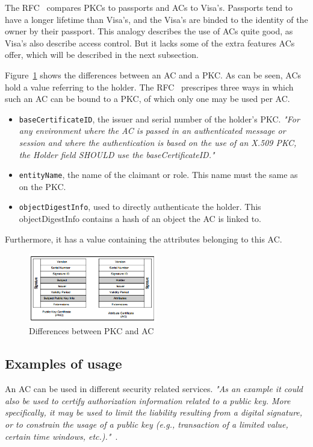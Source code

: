 \documentclass[10pt,conference,a4paper]{IEEEtran}
\begin{document}
The RFC~\cite{rfc_ac} compares PKCs to passports and ACs to Visa's. Passports tend to have a longer lifetime than Visa's, and the Visa's are binded to the identity of the owner by their passport. This analogy describes the use of ACs quite good, as Visa's also describe access control. But it lacks some of the extra features ACs offer, which will be described in the next subsection.

 Figure~\ref{fig:diff} shows the differences between an AC and a PKC. As can be seen, ACs hold a value referring to the holder. The RFC~\cite{rfc_ac} prescripes three ways in which such an AC can be bound to a PKC, of which only one may be used per AC.
\begin{itemize}
	\item \texttt{baseCertificateID}, the issuer and serial number of the holder's PKC. \textit{"For any environment where the AC is passed in an authenticated message or session and where the authentication is based on the use of an X.509 PKC, the Holder field SHOULD use the baseCertificateID."}~\cite{rfc_ac}
	\item \texttt{entityName}, the name of the claimant or role. This name must the same as on the PKC.
	\item \texttt{objectDigestInfo}, used to directly authenticate the holder. This objectDigestInfo contains a hash of an object the AC is linked to.
\end{itemize}
Furthermore, it has a value containing the attributes belonging to this AC.

\begin{figure}[h]
	\centering
	\includegraphics[width=0.5\textwidth]{diff.png}
	\caption{Differences between PKC and AC~\cite{godavari2001secure}}
	\label{fig:diff}
\end{figure}

\subsection{Examples of usage}
An AC can be used in different security related services. \textit{"As an example it could also be used to certify authorization information related to a public key. More specifically, it may be used to limit the liability resulting from a digital signature, or to constrain the usage of a public key (e.g., transaction of a limited value, certain time windows, etc.)."}~\cite{tilborg2011encyclopedia}.
\end{document}
